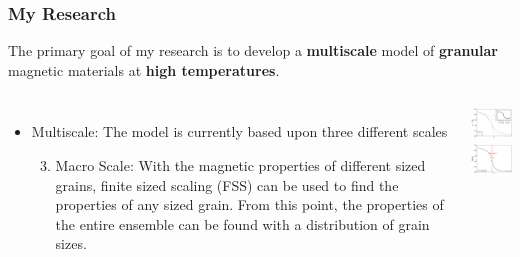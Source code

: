 \documentclass{beamer}
\begin{document}
\begin{frame}
	\frametitle{My Research}
	The primary goal of my research is to develop a \textbf{multiscale} model of \textbf{granular} magnetic materials at \textbf{high temperatures}.
	\begin{columns}
		\column{7cm}
		\begin{itemize}
			\item{Multiscale: The model is currently based upon three different scales}\newline
			\begin{enumerate}
				\setcounter{enumi}{2}
				\item{Macro Scale: With the magnetic properties of different sized grains, finite sized scaling (FSS) can be used to find the properties of any sized grain. \newline \newline From this point, the properties of the entire ensemble can be found with a distribution of grain sizes.}
			\end{enumerate}
		\end{itemize}
		\column{5cm}
		\begin{center}
			\includegraphics[width=4cm]{Images/Ds} \\
			\includegraphics[width=4cm]{Images/Aggregate}
		\end{center}
	\end{columns}
\end{frame}
\end{document}
